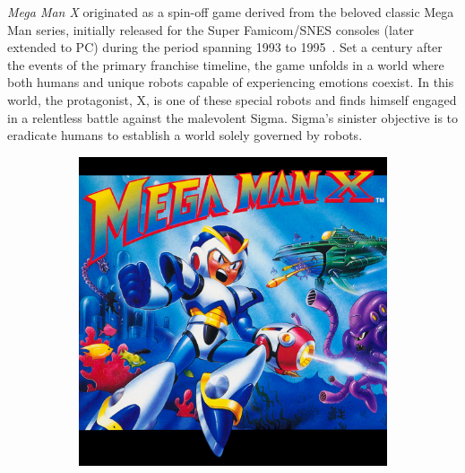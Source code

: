 \textit{Mega Man X} originated as a spin-off game derived from the beloved classic Mega Man series, initially released for the Super Famicom/SNES consoles (later extended to PC) during the period spanning 1993 to 1995~\cite{wiki:MMX}. Set a century after the events of the primary franchise timeline, the game unfolds in a world where both humans and unique robots capable of experiencing emotions coexist. In this world, the protagonist, X, is one of these special robots and finds himself engaged in a relentless battle against the malevolent Sigma. Sigma's sinister objective is to eradicate humans to establish a world solely governed by robots.

\begin{figure}[htp]
	\centering
	\begin{subfigure}[c]{0.4\linewidth}
		\centering
		\includegraphics[width=\linewidth]{figures/X1/mmx_cover.jpeg}
	\end{subfigure}
	\begin{subfigure}[c]{0.4\linewidth}
		\centering

\end{subfigure}
\end{figure}
